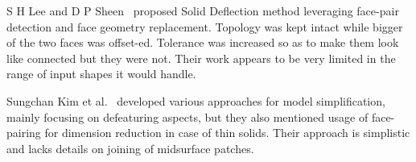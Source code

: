 

S H Lee and D P Sheen~\cite{Sheen2008} proposed Solid Deflection method leveraging face-pair detection and face geometry replacement. Topology was kept intact while bigger of the two faces was offset-ed. Tolerance was increased so as to make them look like connected but they were not. Their work appears to be very limited in the range of input shapes it would handle.
%


Sungchan Kim et al.~\cite{Kim2005} developed various approaches for model simplification, mainly focusing on defeaturing aspects, but they also mentioned usage of face-pairing for dimension reduction in case of thin solids. Their approach is simplistic and lacks details on joining of midsurface patches.


